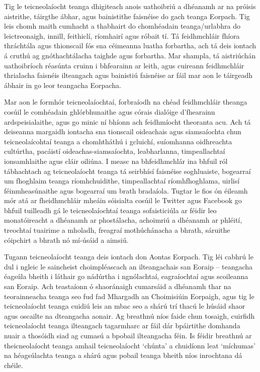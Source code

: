 \begin{multicols}{2}
Tig le teicneolaíocht teanga dhigiteach anois uathoibriú a dhéanamh ar na próisis aistrithe, táirgthe ábhar, agus bainistithe faisnéise do gach teanga Eorpach. Tig leis chomh maith cumhacht a thabhairt do chomhéadain teanga/urlabhra do leictreonaigh, innill, feithiclí, ríomhairí agus róbait tí. Tá feidhmchláir fhíora thráchtála agus thionscail fós sna céimeanna luatha forbartha, ach tá deis iontach á cruthú ag gnóthachtálacha taighde agus forbartha. Mar shampla, tá aistriúchán uathoibríoch réasúnta cruinn i bhfearainn ar leith, agus cuireann feidhmchláir thrialacha faisnéis ilteangach agus bainistiú faisnéise ar fáil mar aon le táirgeadh ábhair in go leor teangacha Eorpacha. 

Mar aon le formhór teicneolaíochtaí, forbraíodh na chéad feidhmchláir theanga cosúil le comhéadain ghlórbhunaithe agus córais dialóige d’fhearainn ardspeisialaithe, agus go minic ní bhíonn ach feidhmíocht theoranta acu. Ach tá deiseanna margaidh iontacha sna tionscail oideachais agus siamsaíochta chun teicneolaícohtaí teanga a chomhtháthú i gcluichí, suíomhanna oidhreachta cultúrtha, pacáistí oideachas-siamsaíochta, leabharlanna, timpeallachtaí ionsamhlaithe agus cláir oiliúna. I measc na bhfeidhmchlár ina bhfuil ról tábhachtach ag teicneolaíocht teanga tá seirbhísí faisnéise soghluaiste, bogearraí um fhoghlaim teanga ríomhchuidithe, timpeallachtaí ríomhfhoghlama, uirlisí féinmheasúnaithe agus bogearraí um brath bradaíola. Tugtar le fios ón éileamh mór atá ar fheidhmchláir mheáin sóisialta cosúil le Twitter agus Facebook go bhfuil tuilleadh gá le teicneolaíochtaí teanga sofaisticiúla ar féidir leo monatóireacht a dhéanamh ar phostálacha, achoimriú a dhéanamh ar phléití, treochtaí tuairime a mholadh, freagraí mothúchánacha a bhrath, sáruithe cóipchirt a bhrath nó mí-úsáid a aimsiú.

Tugann teicneolaíocht teanga deis iontach don Aontas Eorpach. Tig léi cabhrú le dul i ngleic le saincheist choimpléascach an ilteangachais san Eoraip – teangacha éagsúla bheith i láthair go nádúrtha i ngnólachtaí, eagraíochtaí agus scoileanna san Eoraip. Ach teastaíonn ó shaoránaigh cumarsáid a dhéanamh thar na teorainneacha teanga seo fud fad Mhargadh an Choimisiúin Eorpaigh, agus tig le teicneolaíocht teanga cuidiú leis an mbac seo a shárú trí thacú le húsáid shaor agus oscailte na dteangacha aonair. Ag breathnú níos faide chun tosaigh, cuirfidh teicneolaíocht teanga ilteangach tagarmharc ar fáil dár bpáirtithe domhanda nuair a thosóidh siad ag cumasú a bpobail ilteangacha féin. Is féidir breathnú ar theicneolaíocht teanga amhail teicneolaíocht ‘chúnta’ a chuidíonn leat `míchumas’ na héagsúlachta teanga a shárú agus pobail teanga bheith níos inrochtana dá chéile.


\end{multicols}
